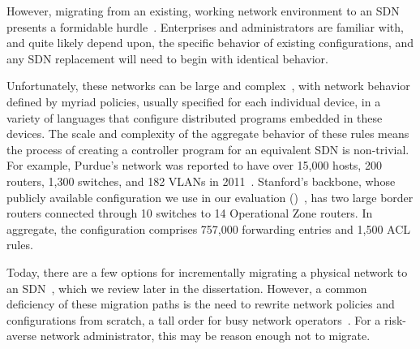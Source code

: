 However, migrating from an existing, working network environment to
an SDN presents a formidable hurdle~\cite{jain++:sigcomm13-google-sdn}.
Enterprises and administrators are familiar
with, and quite likely depend upon, the specific behavior of existing
configurations, and any SDN replacement will need to begin with identical
behavior.

Unfortunately, these networks can be large 
and complex~\cite{kim11evolution,levin13panopticonTR,zeng12test}, with network behavior
defined by myriad policies, 
usually specified for each individual device, in a variety of
languages that configure distributed programs embedded in these
devices. 
The scale and complexity of the aggregate
behavior of these rules means the process of creating a
controller program for an equivalent SDN is non-trivial.
For example, Purdue's network was reported to
have over 15,000 hosts, 200 routers, 1,300 switches, and 182
VLANs in 2011~\cite{sung11systematic}. 
%
Stanford's backbone, whose publicly available configuration we use in
our evaluation ()~\cite{zeng12test}, has two
large border routers connected through 10 switches to 14 Operational Zone
routers. In aggregate, the configuration comprises 757,000 forwarding entries
and 1,500 ACL rules. 


Today, there are a few options for incrementally migrating a physical
network to an SDN~\cite{Casado07Ethane, Casado:hotsdn2012-fabric, levin13panopticonTR}, 
which we review later in the dissertation. However, a common deficiency
of these migration paths is the need to rewrite network policies
and configurations from scratch, a tall order for busy network operators~\cite{Barrett04fieldstudies}.
For a risk-averse network administrator,
this may be reason enough not to migrate. 



